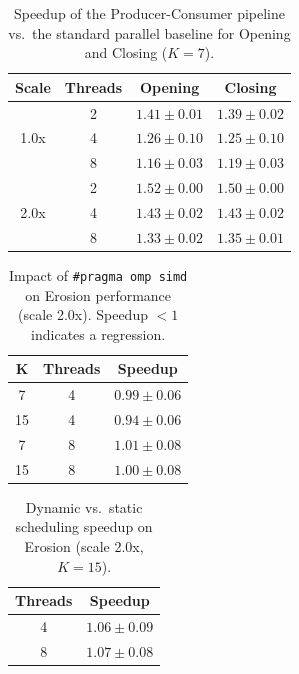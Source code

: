 \documentclass[10pt,twocolumn,letterpaper]{article}
\begin{document}
\begin{table}[htbp]
\centering
\caption{Speedup of the Producer-Consumer pipeline vs.\ the standard 
parallel baseline for Opening and Closing ($K=7$).}
\label{tab:pipeline}
\renewcommand{\arraystretch}{1.15}
\begin{tabular}{cccc}
\hline
\textbf{Scale} & \textbf{Threads} & \textbf{Opening} & \textbf{Closing} \\
\hline
\multirow{3}{*}{1.0x} & 2 & $1.41 \pm 0.01$ & $1.39 \pm 0.02$ \\
                       & 4 & $1.26 \pm 0.10$ & $1.25 \pm 0.10$ \\
                       & 8 & $1.16 \pm 0.03$ & $1.19 \pm 0.03$ \\
\hline
\multirow{3}{*}{2.0x} & 2 & $1.52 \pm 0.00$ & $1.50 \pm 0.00$ \\
                       & 4 & $1.43 \pm 0.02$ & $1.43 \pm 0.02$ \\
                       & 8 & $1.33 \pm 0.02$ & $1.35 \pm 0.01$ \\
\hline
\end{tabular}
\end{table}
\begin{table}[H]
\centering
\caption{Impact of \texttt{\#pragma omp simd} on Erosion performance 
(scale 2.0x). Speedup $<1$ indicates a regression.}
\label{tab:simd}
\renewcommand{\arraystretch}{1.15}
\begin{tabular}{ccc}
\hline
\textbf{K} & \textbf{Threads} & \textbf{Speedup} \\
\hline
7  & 4 & $0.99 \pm 0.06$ \\
15 & 4 & $0.94 \pm 0.06$ \\
7  & 8 & $1.01 \pm 0.08$ \\
15 & 8 & $1.00 \pm 0.08$ \\
\hline
\end{tabular}
\end{table}

\begin{table}[H]
\centering
\caption{Dynamic vs.\ static scheduling speedup on Erosion 
(scale 2.0x, $K=15$).}
\label{tab:scheduling}
\renewcommand{\arraystretch}{1.15}
\begin{tabular}{cc}
\hline
\textbf{Threads} & \textbf{Speedup} \\
\hline
4 & $1.06 \pm 0.09$ \\
8 & $1.07 \pm 0.08$ \\
\hline
\end{tabular}
\end{table}
\end{document}
